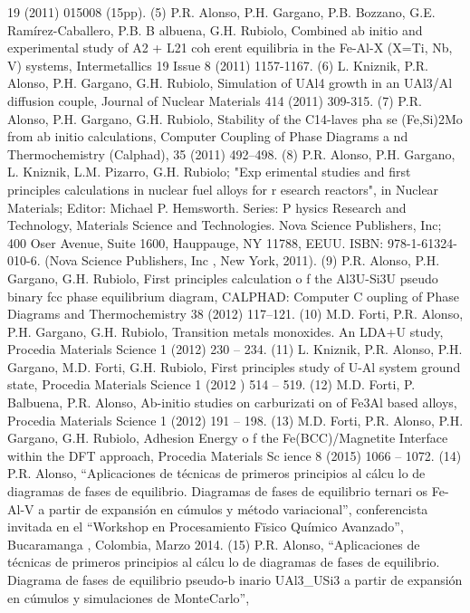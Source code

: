 19 (2011) 015008 (15pp).
    (5)  P.R. Alonso, P.H. Gargano, P.B. Bozzano, G.E. Ramírez-Caballero, P.B. B
albuena, G.H. Rubiolo, Combined ab initio and experimental study of A2 + L21 coh
erent equilibria in the Fe-Al-X (X=Ti, Nb, V) systems, Intermetallics 19 Issue 8
 (2011) 1157-1167. 
    (6)  L. Kniznik, P.R. Alonso, P.H. Gargano, G.H. Rubiolo, Simulation of UAl4
 growth in an UAl3/Al diffusion couple, Journal of Nuclear Materials 414 (2011) 
309-315. 
    (7)  P.R. Alonso, P.H. Gargano, G.H. Rubiolo, Stability of the C14-laves pha
se (Fe,Si)2Mo from ab initio calculations, Computer Coupling of Phase Diagrams a
nd Thermochemistry (Calphad), 35 (2011) 492–498. 
    (8)  P.R. Alonso, P.H. Gargano, L. Kniznik, L.M. Pizarro, G.H. Rubiolo; "Exp
erimental studies and first principles calculations in nuclear fuel alloys for r
esearch reactors", in Nuclear Materials; Editor: Michael P. Hemsworth. Series: P
hysics Research and Technology, Materials Science and Technologies. Nova Science
 Publishers, Inc; 400 Oser Avenue, Suite 1600, Hauppauge, NY 11788, EEUU. ISBN: 
978-1-61324-010-6. (Nova Science Publishers, Inc , New York, 2011).
    (9)  P.R. Alonso, P.H. Gargano, G.H. Rubiolo, First principles calculation o
f the Al3U-Si3U pseudo binary fcc phase equilibrium diagram, CALPHAD: Computer C
oupling of Phase Diagrams and Thermochemistry 38 (2012) 117–121.
    (10)  M.D. Forti, P.R. Alonso, P.H. Gargano, G.H. Rubiolo, Transition metals
 monoxides. An LDA+U study, Procedia Materials Science 1 (2012) 230 – 234.
    (11) L. Kniznik, P.R. Alonso, P.H. Gargano, M.D. Forti, G.H. Rubiolo, First 
principles study of U-Al system ground state, Procedia Materials Science 1 (2012
) 514 – 519.
    (12)  M.D. Forti, P. Balbuena, P.R. Alonso, Ab-initio studies on carburizati
on of Fe3Al based alloys, Procedia Materials Science 1 (2012) 191 – 198.
    (13)  M.D. Forti, P.R. Alonso, P.H. Gargano, G.H. Rubiolo, Adhesion Energy o
f the Fe(BCC)/Magnetite Interface within the DFT approach, Procedia Materials Sc
ience 8 (2015) 1066 – 1072.
    (14)  P.R. Alonso, “Aplicaciones de técnicas de primeros principios al cálcu
lo de diagramas de fases de equilibrio. Diagramas de fases de equilibrio ternari
os Fe-Al-V a partir de expansión en cúmulos y método variacional”, conferencista
 invitada en el “Workshop en Procesamiento Fïsico Químico Avanzado”, Bucaramanga
, Colombia, Marzo 2014.
    (15)  P.R. Alonso, “Aplicaciones de técnicas de primeros principios al cálcu
lo de diagramas de fases de equilibrio. Diagrama de fases de equilibrio pseudo-b
inario UAl3_USi3 a partir de expansión en cúmulos y simulaciones de MonteCarlo”,
